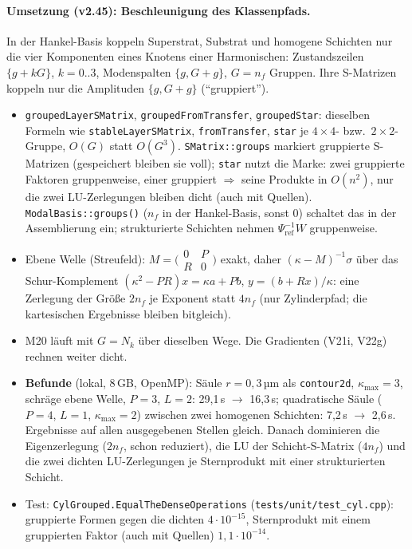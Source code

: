 \paragraph{Umsetzung (v2.45): Beschleunigung des Klassenpfads.}
In der Hankel-Basis koppeln Superstrat, Substrat und homogene Schichten nur die vier Komponenten eines Knotens einer
Harmonischen: Zustandszeilen $\{g+kG\}$, $k=0..3$, Modenspalten $\{g,G+g\}$, $G=n_f$ Gruppen. Ihre S-Matrizen
koppeln nur die Amplituden $\{g,G+g\}$ (\enquote{gruppiert}).
\begin{itemize}[nosep]
  \item \verb|groupedLayerSMatrix|, \verb|groupedFromTransfer|, \verb|groupedStar|: dieselben Formeln wie
        \verb|stableLayerSMatrix|, \verb|fromTransfer|, \verb|star| je $4\times4$- bzw.\ $2\times2$-Gruppe, $O(G)$ statt
        $O(G^3)$. \verb|SMatrix::groups| markiert gruppierte S-Matrizen (gespeichert bleiben sie voll); \verb|star| nutzt
        die Marke: zwei gruppierte Faktoren gruppenweise, einer gruppiert $\Rightarrow$ seine Produkte in $O(n^2)$, nur
        die zwei LU-Zerlegungen bleiben dicht (auch mit Quellen). \verb|ModalBasis::groups()| ($n_f$ in der
        Hankel-Basis, sonst 0) schaltet das in der Assemblierung ein; strukturierte Schichten nehmen
        $\Psi_{\text{ref}}^{-1}W$ gruppenweise.
  \item Ebene Welle (Streufeld): $M=\bigl(\begin{smallmatrix}0&P\\R&0\end{smallmatrix}\bigr)$ exakt, daher
        $(\kappa-M)^{-1}\sigma$ über das Schur-Komplement $(\kappa^2-PR)x=\kappa a+Pb$, $y=(b+Rx)/\kappa$: eine Zerlegung
        der Größe $2n_f$ je Exponent statt $4n_f$ (nur Zylinderpfad; die kartesischen Ergebnisse bleiben bitgleich).
  \item M20 läuft mit $G=N_k$ über dieselben Wege. Die Gradienten (V21i, V22g) rechnen weiter dicht.
  \item \textbf{Befunde} (lokal, 8\,GB, OpenMP): Säule $r=0{,}3$\,µm als \verb|contour2d|, $\kappa_{\max}=3$, schräge
        ebene Welle, $P=3$, $L=2$: 29,1\,s $\to$ 16,3\,s; quadratische Säule ($P=4$, $L=1$, $\kappa_{\max}=2$) zwischen zwei
        homogenen Schichten: 7,2\,s $\to$ 2,6\,s. Ergebnisse auf allen ausgegebenen Stellen gleich. Danach dominieren
        die Eigenzerlegung ($2n_f$, schon reduziert), die LU der Schicht-S-Matrix ($4n_f$) und die zwei dichten
        LU-Zerlegungen je Sternprodukt mit einer strukturierten Schicht.
  \item Test: \verb|CylGrouped.EqualTheDenseOperations| (\verb|tests/unit/test_cyl.cpp|): gruppierte Formen gegen die
        dichten $4\cdot10^{-15}$, Sternprodukt mit einem gruppierten Faktor (auch mit Quellen) $1{,}1\cdot10^{-14}$.
\end{itemize}

